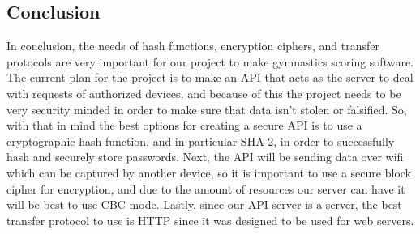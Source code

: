 \documentclass[a4paper, 10pt, draftclsnofoot, onecolumn]{article}
\begin{document}
\begin{center}
\section*{Conclusion}
\end{center}
In conclusion, the needs of hash functions, encryption ciphers, and transfer protocols are very important for our project to make gymnastics scoring software. The current plan for the project is to make an API that acts as the server to deal with requests of authorized devices, and because of this the project needs to be very security minded in order to make sure that data isn't stolen or falsified. So, with that in mind the best options for creating a secure API is to use a cryptographic hash function, and in particular SHA-2, in order to successfully hash and securely store passwords. Next, the API will be sending data over wifi which can be captured by another device, so it is important to use a secure block cipher for encryption, and due to the amount of resources our server can have it will be best to use CBC mode. Lastly, since our API server is a server, the best transfer protocol to use is HTTP since it was designed to be used for web servers.



\end{document}
